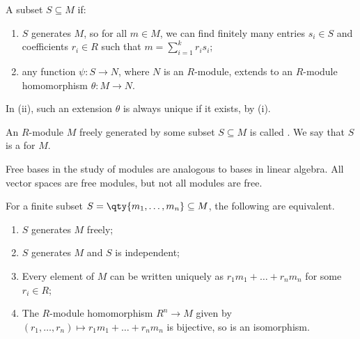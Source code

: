 \begin{definition}
	A subset $S \subseteq M$  if:
	\begin{enumerate}
		\item $S$ generates $M$, so for all $m \in M$, we can find finitely many entries $s_i \in S$ and coefficients $r_i \in R$ such that $m = \sum_{i=1}^k r_i s_i$;
		\item any function $\psi : S \to N$, where $N$ is an $R$-module, extends to an $R$-module homomorphism $\theta : M \to N$.
	\end{enumerate}
\end{definition}

\begin{remark}
	In (ii), such an extension $\theta$ is always unique if it exists, by (i).
\end{remark}

\begin{definition}[Free]
	An $R$-module $M$ freely generated by some subset $S \subseteq M$ is called .
	We say that $S$ is a  for $M$.
\end{definition}

\begin{remark}
	Free bases in the study of modules are analogous to bases in linear algebra.
	All vector spaces are free modules, but not all modules are free.
\end{remark}

\begin{proposition} \label{prp:15.2}
	For a finite subset $S = \qty{m_1, \dots, m_n} \subseteq M$, the following are equivalent.
	\begin{enumerate}
		\item $S$ generates $M$ freely;
		\item $S$ generates $M$ and $S$ is independent;
		\item Every element of $M$ can be written uniquely as $r_1 m_1 + \dots + r_n m_n$ for some $r_i \in R$;
		\item The $R$-module homomorphism $R^n \to M$ given by $(r_1, \dots, r_n) \mapsto r_1 m_1 + \dots + r_n m_n$ is bijective, so is an isomorphism.
	\end{enumerate}
\end{proposition}

